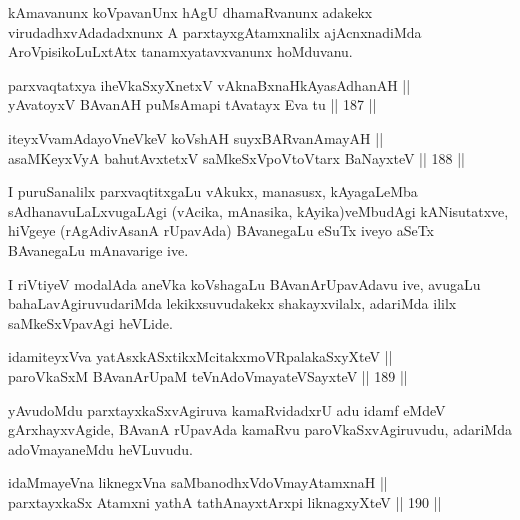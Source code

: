 \begin{artha}
kAmavanunx koVpavanUnx hAgU dhamaRvanunx adakekx virudadhxvAdadadxnunx
A parxtayxgAtamxnalilx ajAcnxnadiMda AroVpisikoLuLxtAtx
tanamxyatavxvanunx hoMduvanu.
\end{artha}


\begin{shl}
parxvaqtatxya iheVkaSxyXnetxV vAknaBxnaHkAyasAdhanAH || \\
yAvatoyxV BAvanAH puMsAmapi tAvatayx Eva tu \hfill || 187 ||  
\end{shl}

\begin{shl}
iteyxVvamAdayoV\s neVkeV koVshAH suyxBARvanAmayAH || \\
asaMKeyxVyA bahutAvxtetxV saMkeSxVpoV\s toV\s tarx BaNayxteV \hfill || 188 ||  
\end{shl}

\begin{artha}
I puruSanalilx parxvaqtitxgaLu vAkukx, manasusx, kAyagaLeMba
sAdhanavuLaLxvugaLAgi (vAcika, mAnasika, kAyika)veMbudAgi
kANisutatxve, hiVgeye (rAgAdivAsanA rUpavAda) BAvanegaLu eSuTx iveyo
aSeTx BAvanegaLu mAnavarige ive.
\end{artha}

\begin{artha}
I riVtiyeV modalAda aneVka koVshagaLu BAvanArUpavAdavu ive, avugaLu
bahaLavAgiruvudariMda lekikxsuvudakekx shakayxvilalx, adariMda ililx
saMkeSxVpavAgi heVLide.
\end{artha}


\begin{shl}
idamiteyxVva yatAsxkASxtikxMcitakxmoVRpalakaSxyXteV || \\
paroVkaSxM BAvanArUpaM teVnAdoVmayateVSayxteV \hfill || 189 ||  
\end{shl}

\begin{artha}
yAvudoMdu parxtayxkaSxvAgiruva kamaRvidadxrU adu idamf eMdeV
gArxhayxvAgide, BAvanA rUpavAda kamaRvu paroVkaSxvAgiruvudu, adariMda
adoVmayaneMdu heVLuvudu.
\end{artha}

\begin{shl}
idaMmayeVna liknegxVna saMbanodhxV\s doVmayAtamxnaH || \\
parxtayxkaSx Atamxni yathA tathA\s nayxtArxpi liknagxyXteV \hfill || 190 ||  
\end{shl}

